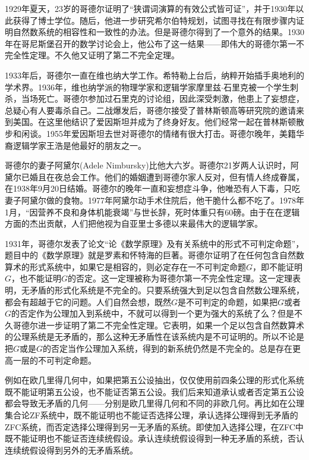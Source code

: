\documentclass{article}
\begin{document}
1929年夏天，23岁的哥德尔证明了“狭谓词演算的有效公式皆可证”，并于1930年以此获得了博士学位。随后，他进一步研究希尔伯特规划，试图寻找在有限步骤内证明自然数系统的相容性和一致性的办法。但是哥德尔得到了一个意外的结果。1930年在哥尼斯堡召开的数学讨论会上，他公布了这一结果——即伟大的哥德尔第一不完全性定理。不久他又证明了第二不完全定理。

1933年后，哥德尔一直在维也纳大学工作。希特勒上台后，纳粹开始插手奥地利的学术界。1936年，维也纳学派的物理学家和逻辑学家摩里兹$\cdot$石里克被一个学生刺杀，当场死亡。哥德尔参加过石里克的讨论组，因此深受刺激，他患上了妄想症，总疑心有人要毒杀自己。二战爆发后，哥德尔接受了普林斯顿高等研究院的邀请来到美国。在这里他结识了爱因斯坦并成为了终身好友。他们经常一起在普林斯顿散步和闲谈。1955年爱因斯坦去世对哥德尔的情绪有很大打击。哥德尔晚年，美籍华裔逻辑学家王浩是他最好的朋友之一。

哥德尔的妻子阿黛尔(Adele Nimbursky)比他大六岁。哥德尔21岁两人认识时，阿黛尔已婚且在夜总会工作。他们的婚姻遭到哥德尔家人反对，但有情人终成眷属，在1938年9月20日结婚。哥德尔的晚年一直和妄想症斗争，他唯恐有人下毒，只吃妻子阿黛尔做的食物。1977年阿黛尔动手术住院后，他干脆什么都不吃了。1978年1月，“因营养不良和身体机能衰竭”与世长辞，死时体重只有60磅。由于在在逻辑方面的杰出贡献，人们把他视为自亚里士多德以来最伟大的逻辑学家。

1931年，哥德尔发表了论文“论《数学原理》及有关系统中的形式不可判定命题”，题目中的《数学原理》就是罗素和怀特海的巨著。哥德尔证明了在任何包含自然数算术的形式系统中，如果它是相容的，则必定存在一不可判定命题$G$，即不能证明$G$，也不能证明$G$的否定。这一定理被称为哥德尔第一不完全性定理。这一定理表明，无矛盾的形式化系统是不完全的。只要系统强大到足以包含自然数公理系统，都会有超越于它的问题。人们自然会想，既然$G$是不可判定的命题，如果把$G$或者$G$的否定作为公理加入到系统中，不就可以得到一个更为强大的系统了么？但是不久哥德尔进一步证明了第二不完全性定理。它表明，如果一个足以包含自然数算术的公理系统是无矛盾的，那么这种无矛盾性在该系统内是不可证明的。所以不论是把$G$或是$G$的否定当作公理加入系统，得到的新系统仍然是不完全的。总是存在更高一层的不可判定命题。

例如在欧几里得几何中，如果把第五公设抽出，仅仅使用前四条公理的形式化系统既不能证明第五公设，也不能证否第五公设。我们后来知道承认或者否定第五公设都会导致无矛盾的几何——分别是欧几里得几何和不同的非欧几何。再比如在公理集合论ZF系统中，既不能证明也不能证否选择公理，承认选择公理得到无矛盾的ZFC系统，而否定选择公理得到另一无矛盾的系统。即使加入选择公理，在ZFC中既不能证明也不能证否连续统假设。承认连续统假设得到一种无矛盾的系统，否认连续统假设得到另外的无矛盾系统。
\end{document}
